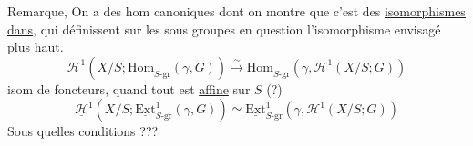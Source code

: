 Remarque, On a des hom canoniques
dont on montre que c'est des \uline{isomorphismes dans}, qui définissent sur les sous groupes en question l'isomorphisme envisagé plus haut.
\[
\boxed{\underline{\mathscr H}^{1}(X/S;\underline{\mathrm{Hom}}_{S\text{-}\mathrm{gr}}(\gamma,G))\mathrel{\overset{\sim}{\longrightarrow}}\underline{\mathrm{Hom}}_{S\text{-}\mathrm{gr}}(\gamma,\underline{\mathscr H}^{1}(X/S;G))}
\]
isom de foncteurs,  quand tout est \uline{affine} sur $S$ (?)
\[
\boxed{\underline{\mathscr H}^{1}(X/S;\underline{\mathrm{Ext}}^{1}_{S\text{-}\mathrm{gr}}(\gamma,G))\simeq\underline{\mathrm{Ext}}^{1}_{S\text{-}\mathrm{gr}}(\gamma,\mathscr H^{1}(X/S;G))}
\]
Sous quelles conditions ???

